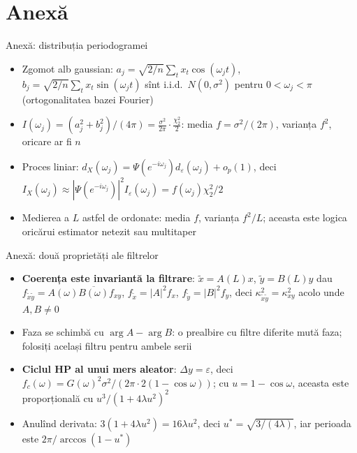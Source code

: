 \section{Anexă}

\begin{frame}{Anexă: distribuția periodogramei}
\hypertarget{atsapp1}{}
\itemsize{\small}
\begin{itemize}
    \item Zgomot alb gaussian: $a_j = \sqrt{2/n}\sum_tx_t\cos(\omega_jt)$, $b_j = \sqrt{2/n}\sum_tx_t\sin(\omega_jt)$ sînt i.i.d.\ $N(0, \sigma^2)$ pentru $0 < \omega_j < \pi$ (ortogonalitatea bazei Fourier)
    \item $I(\omega_j) = (a_j^2 + b_j^2)/(4\pi) = \frac{\sigma^2}{2\pi}\cdot\frac{\chi^2_2}{2}$: media $f = \sigma^2/(2\pi)$, varianța $f^2$, oricare ar fi $n$
    \item Proces liniar: $d_X(\omega_j) = \Psi(e^{-i\omega_j})d_\varepsilon(\omega_j) + o_p(1)$, deci $I_X(\omega_j) \approx |\Psi(e^{-i\omega_j})|^2I_\varepsilon(\omega_j) = f(\omega_j)\chi^2_2/2$
    \item Medierea a $L$ astfel de ordonate: media $f$, varianța $f^2/L$; aceasta este logica oricărui estimator netezit sau multitaper
\end{itemize}
\end{frame}

\begin{frame}{Anexă: două proprietăți ale filtrelor}
\hypertarget{atsapp2}{}
\itemsize{\small}
\begin{itemize}
    \item \textbf{Coerența este invariantă la filtrare}: $\tilde x = A(L)x$, $\tilde y = B(L)y$ dau $f_{\tilde x\tilde y} = A(\omega)\overline{B(\omega)}f_{xy}$, $f_{\tilde x} = |A|^2f_x$, $f_{\tilde y} = |B|^2f_y$, deci $\kappa^2_{\tilde x\tilde y} = \kappa^2_{xy}$ acolo unde $A, B \ne 0$
    \item Faza se schimbă cu $\arg A - \arg B$: o prealbire cu filtre diferite mută faza; folosiți același filtru pentru ambele serii
    \item \textbf{Ciclul HP al unui mers aleator}: $\Delta y = \varepsilon$, deci $f_c(\omega) = G(\omega)^2\sigma^2/(2\pi\cdot2(1 - \cos\omega))$; cu $u = 1 - \cos\omega$, aceasta este proporțională cu $u^3/(1 + 4\lambda u^2)^2$
    \item Anulînd derivata: $3(1 + 4\lambda u^2) = 16\lambda u^2$, deci $u^* = \sqrt{3/(4\lambda)}$, iar perioada este $2\pi/\arccos(1 - u^*)$
\end{itemize}
\end{frame}


